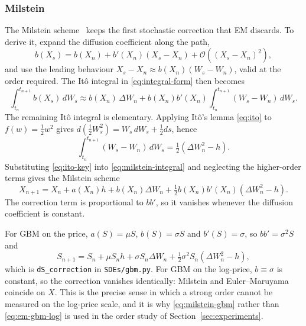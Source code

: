\documentclass[11pt,a4paper]{article}
\theoremstyle{definition}
\theoremstyle{remark}
\begin{document}
\subsubsection{Milstein}

The Milstein scheme~\cite{milstein} keeps the first stochastic correction that
EM discards. To derive it, expand the diffusion coefficient along the path,
\begin{equation}
    b(X_s) = b(X_n) + b'(X_n)(X_s - X_n)
             + \mathcal{O}\!\left( (X_s - X_n)^2 \right),
\end{equation}
and use the leading behaviour $X_s - X_n \approx b(X_n)(W_s - W_n)$, valid at
the order required. The It\^o integral in \eqref{eq:integral-form} then becomes
\begin{equation}
    \int_{t_n}^{t_{n+1}} b(X_s)\, dW_s
    \approx b(X_n)\, \Delta W_n
           + b(X_n) b'(X_n) \int_{t_n}^{t_{n+1}} (W_s - W_n)\, dW_s .
    \label{eq:milstein-integral}
\end{equation}
The remaining It\^o integral is elementary. Applying It\^o's lemma
\eqref{eq:ito} to $f(w) = \tfrac12 w^2$ gives
$d\!\left( \tfrac12 W_s^2 \right) = W_s\, dW_s + \tfrac12 ds$, hence
\begin{equation}
    \int_{t_n}^{t_{n+1}} (W_s - W_n)\, dW_s
    = \tfrac12 \left( \Delta W_n^2 - h \right).
    \label{eq:ito-key}
\end{equation}
Substituting \eqref{eq:ito-key} into \eqref{eq:milstein-integral} and neglecting
the higher-order terms gives the Milstein scheme
\begin{equation}
    X_{n+1} = X_n + a(X_n) h + b(X_n) \Delta W_n
              + \tfrac12 b(X_n) b'(X_n)
                \left( \Delta W_n^2 - h \right).
    \label{eq:milstein-general}
\end{equation}
The correction term is proportional to $b b'$, so it vanishes whenever the
diffusion coefficient is constant.

For GBM on the price, $a(S) = \mu S$, $b(S) = \sigma S$ and $b'(S) = \sigma$, so
$b b' = \sigma^2 S$ and
\begin{equation}
    S_{n+1} = S_n + \mu S_n h + \sigma S_n \Delta W_n
              + \tfrac12 \sigma^2 S_n \left( \Delta W_n^2 - h \right),
    \label{eq:milstein-gbm}
\end{equation}
which is \texttt{dS\_correction} in \texttt{SDEs/gbm.py}. For GBM on the
log-price, $b \equiv \sigma$ is constant, so the correction vanishes
identically: Milstein and Euler--Maruyama coincide on $X$. This is the precise
sense in which a strong order cannot be measured on the log-price scale, and it
is why \eqref{eq:milstein-gbm} rather than \eqref{eq:em-gbm-log} is used in the
order study of Section~\ref{sec:experiments}.
\end{document}
